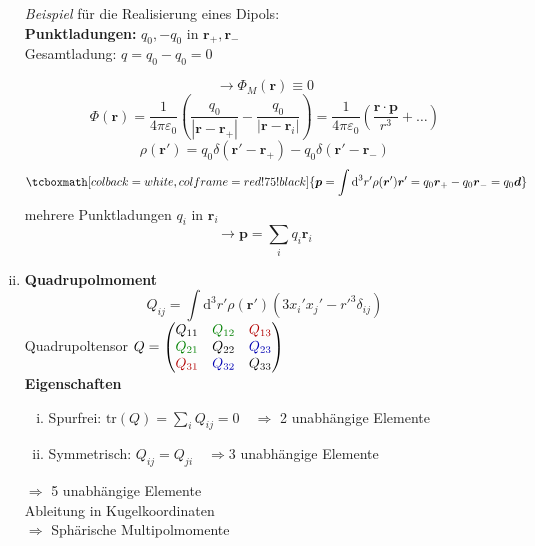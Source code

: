 \documentclass[titlepage,11pt,a4paper,ngerman]{report}
\newcommand{\tx}[1]{\textrm{#1}}
\newcommand{\dd}{\tx{d}}
\renewcommand{\Phi}{\varPhi}
\renewcommand{\vec}[1]{\boldsymbol{#1}}
\renewcommand{\epsilon}{\varepsilon}
\newcommand{\rmbox}[1]{\tcboxmath[colback=white,colframe=red!75!black]{#1}}
\begin{document}
\begin{enumerate}[i)]
	\begin{minipage}{.5\linewidth}
		\emph{Beispiel} für die Realisierung eines Dipols:\\
		\textbf{Punktladungen:} $q_0,-q_0$ in $\vec{r}_+,\vec{r}_-$\\
		Gesamtladung: $q=q_0-q_0=0$
	\end{minipage}%
	\begin{minipage}{.5\linewidth}
		\centering
	\end{minipage}%
	\[\rightarrow\Phi_M(\vec{r})\equiv0\]
	\[\Phi(\vec{r})=\frac{1}{4\pi\epsilon_0}\left(\frac{q_0}{|\vec{r}-\vec{r}_+|}-\frac{q_0}{|\vec{r}-\vec{r}_i|}\right)=\frac{1}{4\pi\epsilon_0}\left(\frac{\vec{r}\cdot\vec{p}}{r^3}+\ldots\right)\]
	\[\rho(\vec{r}')=q_0\delta(\vec{r}'-\vec{r}_+)-q_0\delta(\vec{r}'-\vec{r}_-)\]
	\[\rmbox{\vec{p}=\int\dd^3r'\rho(\vec{r}')\vec{r}'=q_0\vec{r}_+-q_0\vec{r}_-=q_0\vec{d}}\]
	mehrere Punktladungen $q_i$ in $\vec{r}_i$\\
	\[\rightarrow\vec{p}=\sum_iq_i\vec{r}_i\]
	\item \textbf{Quadrupolmoment}
	\[Q_{ij}=\int\dd^3r'\rho(\vec{r}')(3x_i'x_j'-r'^3\delta_{ij})\]
	Quadrupoltensor $Q=\begin{pmatrix}Q_{11}& \color{black!50!green} Q_{12}& \color{black!30!red} Q_{13}\\\color{black!50!green} Q_{21} &Q_{22}& \color{black!30!blue} Q_{23}\\\color{black!30!red} Q_{31} & \color{black!30!blue} Q_{32} & Q_{33}\end{pmatrix}$\\ 
	\textbf{Eigenschaften}
	\begin{enumerate}[i)]
		\item Spurfrei: $\mathrm{tr}(Q)=\sum_iQ_{ij}=0 \quad \Rightarrow $ 2 unabhängige Elemente
		\item Symmetrisch: $Q_{ij}=Q_{ji} \quad \Rightarrow 3 $ unabhängige Elemente
	\end{enumerate}
	$\Rightarrow$ 5 unabhängige Elemente\\[5pt]
	
	Ableitung in Kugelkoordinaten\\
	$\Rightarrow$ Sphärische Multipolmomente
\end{enumerate}
\end{document}
